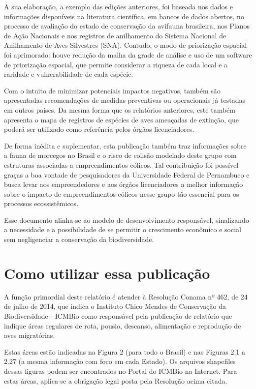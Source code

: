 \documentclass[
]{scrbook}
\begin{document}
A sua elaboração, a exemplo das edições anteriores, foi baseada nos dados e informações disponíveis na literatura científica, em bancos de dados abertos, no processo de avaliação do estado de conservação da avifauna brasileira, nos Planos de Ação Nacionais e nos registros de anilhamento do Sistema Nacional de Anilhamento de Aves Silvestres (SNA). Contudo, o modo de priorização espacial foi aprimorado: houve redução da malha da grade de análise e uso de um software de priorização espacial, que permite considerar a riqueza de cada local e a raridade e vulnerabilidade de cada espécie.

Com o intuito de minimizar potenciais impactos negativos, também são apresentadas recomendações de medidas preventivas ou operacionais já testadas em outros países. Da mesma forma que os relatórios anteriores, este também apresenta o mapa de registros de espécies de aves ameaçadas de extinção, que poderá ser utilizado como referência pelos órgãos licenciadores.

De forma inédita e suplementar, esta publicação também traz informações sobre a fauna de morcegos no Brasil e o risco de colisão modelado deste grupo com estruturas associadas a empreendimentos eólicos. Tal contribuição foi possível graças a boa vontade de pesquisadores da Universidade Federal de Pernambuco e busca levar aos empreendedores e aos órgãos licenciadores a melhor informação sobre o impacto de empreendimentos eólicos nesse grupo tão essencial para os processos ecossistêmicos.

Esse documento alinha-se ao modelo de desenvolvimento responsável, sinalizando a necessidade e a possibilidade de se permitir o crescimento econômico e social sem negligenciar a conservação da biodiversidade.

\hypertarget{como-utilizar}{%
\chapter*{Como utilizar essa publicação}\label{como-utilizar}}

A função primordial deste relatório é atender à Resolução Conama nº 462, de 24 de julho de 2014, que indica o Instituto Chico Mendes de Conservação da Biodiversidade - ICMBio como responsável pela publicação de relatório que indique áreas regulares de rota, pousio, descanso, alimentação e reprodução de aves migratórias.

Estas áreas estão indicadas na Figura 2 (para todo o Brasil) e nas Figuras 2.1 a 2.27 (a mesma informação com foco em cada Estado). Os arquivos shapefiles dessas figuras podem ser encontrados no Portal do ICMBio na Internet. Para estas áreas,
aplica-se a obrigação legal posta pela Resolução acima citada.
\end{document}

